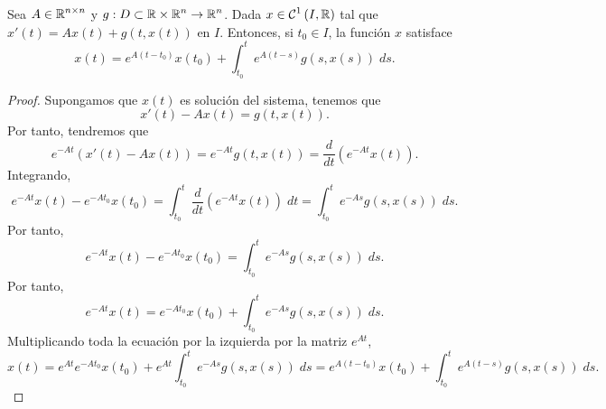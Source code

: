 \begin{prop}
Sea $\displaystyle A \in \mathbb{R}^{n \times n} $ y $\displaystyle g : D \subset \mathbb{R} \times \mathbb{R}^{n} \to \mathbb{R}^{n} $. Dada $\displaystyle x \in \mathcal{C}^{1}\left(I, \mathbb{R}\right) $ tal que $\displaystyle x'\left(t\right)=Ax\left(t\right) + g\left(t, x\left(t\right)\right) $ en $\displaystyle I $. 
Entonces, si $\displaystyle t_{0} \in I $, la función $\displaystyle x $ satisface 
\[x\left(t\right)=e^{A\left(t-t_{0}\right)}x\left(t_{0}\right) + \int^{t}_{t_{0}} e^{A\left(t-s\right)}g\left(s, x\left(s\right)\right) \; d s .\]
\end{prop}
\begin{proof}
Supongamos que $\displaystyle x\left(t\right) $ es solución del sistema, tenemos que 
\[x'\left(t\right) - Ax\left(t\right)=g\left(t,x\left(t\right)\right) .\]
Por tanto, tendremos que 
\[e^{-At}\left(x'\left(t\right)-Ax\left(t\right)\right) = e^{-At}g\left(t, x\left(t\right)\right) = \frac{d}{dt}\left(e^{-At}x\left(t\right)\right).\]
Integrando, 
\[e^{-At}x\left(t\right)-e^{-At_{0}}x\left(t_{0}\right)=\int^{t}_{t_{0}} \frac{d}{d t}\left(e^{-At}x\left(t\right)\right) \; dt = \int^{t}_{t_{0}} e^{-As}g\left(s, x\left(s\right)\right) \; d s  .\]
Por tanto, 
\[e^{-At}x\left(t\right)-e^{-At_{0}}x\left(t_{0}\right)=\int^{t}_{t_{0}} e^{-As}g\left(s, x\left(s\right)\right) \; d s  .\]
Por tanto, 
\[e^{-At}x\left(t\right)=e^{-At_{0}}x\left(t_{0}\right) + \int^{t}_{t_{0}} e^{-As} g\left(s, x\left(s\right)\right)\; d s .\]
Multiplicando toda la ecuación por la izquierda por la matriz $\displaystyle e^{At} $, 
\[x\left(t\right)= e^{At}e^{-At_{0}}x\left(t_{0}\right)+e^{At}\int^{t}_{t_{0}} e^{-As}g\left(s, x\left(s\right)\right) \; d s= e^{A\left(t-t_{0}\right)}x\left(t_{0}\right)+\int^{t}_{t_{0}} e^{A\left(t- s\right)}g\left(s, x\left(s\right)\right) \; d s  .\]
\end{proof}

